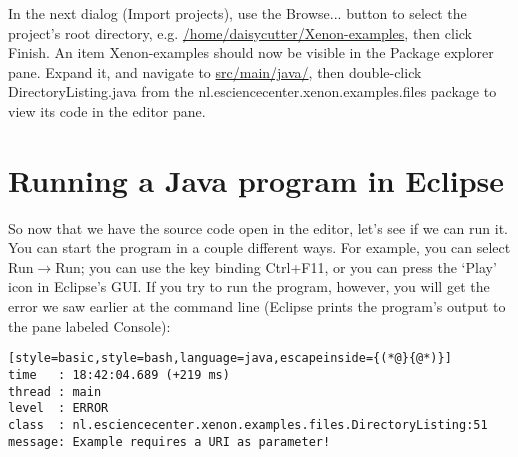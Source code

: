In the next dialog (\textsf{Import projects}), use the \textsf{Browse...} button to select the project's root directory, e.g. \url{/home/daisycutter/Xenon-examples}, then click \textsf{Finish}. An item \textsf{Xenon-examples} should now be visible in the \textsf{Package explorer} pane. Expand it, and navigate to \url{src/main/java/}, then double-click \textsf{DirectoryListing.java} from the \textsf{nl.esciencecenter.xenon.examples.files} package to view its code in the editor pane.




\section{Running a Java program in Eclipse}

So now that we have the source code open in the editor, let's see if we can run it. You can start the program in a couple different ways. For example, you can select \textsf{Run}$\rightarrow$\textsf{Run}; you can use the key binding \textsf{Ctrl+F11}, or you can press the `Play' icon in Eclipse's GUI. If you try to run the program, however, you will get the error we saw earlier at the command line (Eclipse prints the program's output to the pane labeled \textsf{Console}):
\begin{lstlisting}[style=basic,style=bash,language=java,escapeinside={(*@}{@*)}]
time   : 18:42:04.689 (+219 ms)
thread : main
level  : ERROR
class  : nl.esciencecenter.xenon.examples.files.DirectoryListing:51
message: Example requires a URI as parameter!
\end{lstlisting}

